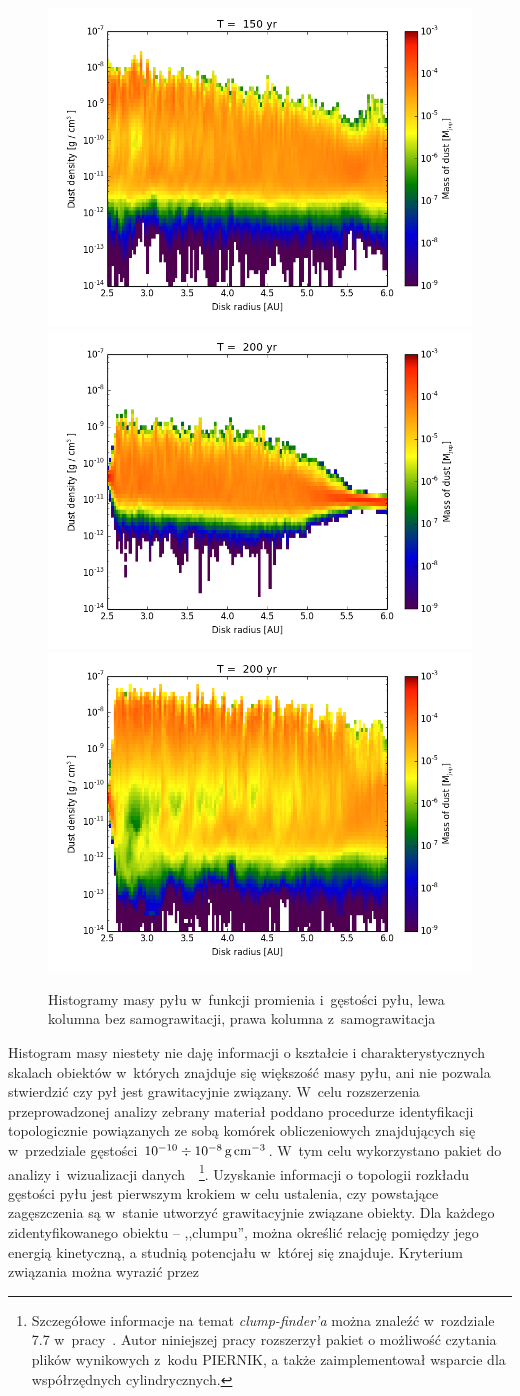 \begin{figure}
  \includegraphics[width=0.4\linewidth]{figures/hist2d_sg_03.png} \\
  \includegraphics[width=0.4\linewidth]{figures/hist2d_nosg_04.png}
  \includegraphics[width=0.4\linewidth]{figures/hist2d_sg_04.png} 
  \caption{Histogramy masy pyłu w~funkcji promienia i~gęstości pyłu, lewa
  kolumna bez samograwitacji, prawa kolumna z~samograwitacja}
  \label{fig:hists} 
\end{figure}
%
\par Histogram masy niestety nie daję informacji o kształcie i
charakterystycznych skalach obiektów w~których znajduje się większość masy pyłu,
ani nie pozwala stwierdzić czy pył jest grawitacyjnie związany. W~celu
rozszerzenia przeprowadzonej analizy zebrany materiał poddano procedurze
identyfikacji topologicznie powiązanych ze sobą komórek obliczeniowych
znajdujących się w~przedziale gęstości $10^{-10}\div10^{-8}\hbox{$\thinspace\textrm{g}$}\hbox{$\thinspace\textrm{cm}$}^{-3}$. W~tym
celu wykorzystano pakiet do analizy i~wizualizacji
danych~\yt{}~\footnote{Szczegółowe informacje na temat \emph{clump-finder'a}
można znaleźć w~rozdziale 7.7 w~pracy~\cite{yt}. Autor niniejszej pracy
rozszerzył pakiet \yt{} o możliwość czytania plików wynikowych z~kodu
PIERNIK, a także zaimplementował wsparcie dla współrzędnych cylindrycznych.}.
Uzyskanie informacji o topologii rozkładu gęstości pyłu jest pierwszym krokiem w
celu ustalenia, czy powstające zagęszczenia są w~stanie utworzyć grawitacyjnie
związane obiekty. Dla każdego zidentyfikowanego obiektu -- ,,clumpu'', można
określić relację pomiędzy jego energią kinetyczną, a studnią potencjału w~której
się znajduje. Kryterium związania można wyrazić przez

